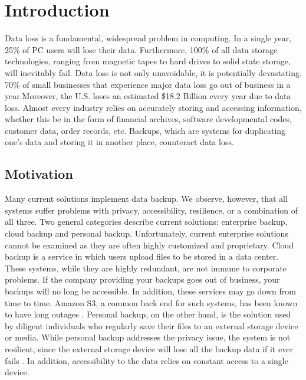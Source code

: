 \chapter{Introduction}
Data loss is a fundamental, widespread problem in computing. In a single year, 25\% of PC users will lose their data. Furthermore, 100\% of all data storage technologies, ranging from magnetic tapes to hard drives to solid state storage, will inevitably fail.  Data loss is not only unavoidable, it is potentially devastating. 70\% of small businesses that experience major data loss go out of business in a year.\footnotemark[1] Moreover, the U.S. loses an estimated \$18.2 Billion every year due to data loss.  Almost every industry relies on accurately storing and accessing information, whether this be in the form of financial archives, software developmental codes, customer data, order records, etc. Backups, which are systems for duplicating one’s data and storing it in another place, counteract data loss.


\section{Motivation}
Many current solutions implement data backup. We observe, however, that all systems suffer problems with privacy, accessibility, resilience, or a combination of all three. Two general categories describe current solutions: enterprise backup, cloud backup and personal backup. Unfortunately, current enterprise solutions cannot be examined as they are often highly customized and proprietary. Cloud backup is a service in which users upload files to be stored in a data center. These systems, while they are highly redundant, are not immune to corporate problems. If the company providing your backups goes out of business, your backups will no long be accessible. In addition, these services may go down from time to time. Amazon S3, a common back end for such systems, has been known to have long outages  . Personal backup, on the other hand, is the solution used by diligent individuals who regularly save their files to an external storage device or media. While personal backup addresses the privacy issue, the system is not resilient, since the external storage device will lose all the backup data if it ever fails . In addition, accessibility to the data relies on constant access to a single device.

